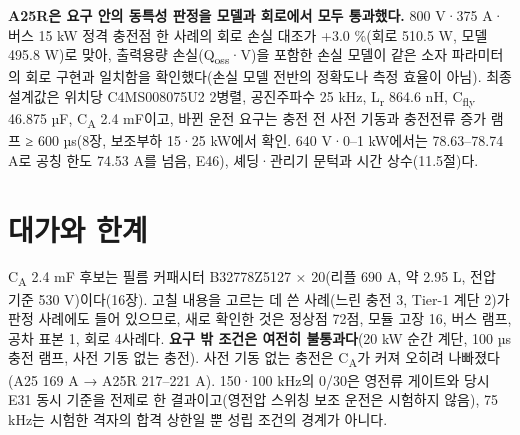 \textbf{A25R은 요구 안의 동특성 판정을 모델과 회로에서 모두 통과했다.} 800 V·375 A·버스 15 kW 정격 충전점 한 사례의 회로 손실 대조가 +3.0 \%(회로 510.5 W, 모델 495.8 W)로 맞아, 출력용량 손실(Q\textsubscript{oss}·V)을 포함한 손실 모델이 같은 소자 파라미터의 회로 구현과 일치함을 확인했다(손실 모델 전반의 정확도나 측정 효율이 아님). 최종 설계값은 위치당 C4MS008075U2 2병렬, 공진주파수 25 kHz, L\textsubscript{r} 864.6 nH, C\textsubscript{fly} 46.875 µF, C\textsubscript{A} 2.4 mF이고, 바뀐 운전 요구는 충전 전 사전 기동과 충전전류 증가 램프 ≥ 600 µs(8장, 보조부하 15·25 kW에서 확인. 640 V·0–1 kW에서는 78.63–78.74 A로 공칭 한도 74.53 A를 넘음, E46), 셰딩·관리기 문턱과 시간 상수(11.5절)다.

\section{대가와 한계}

C\textsubscript{A} 2.4 mF 후보는 필름 커패시터 B32778Z5127 × 20(리플 690 A, 약 2.95 L, 전압 기준 530 V)이다(16장). 고칠 내용을 고르는 데 쓴 사례(느린 충전 3, Tier-1 계단 2)가 판정 사례에도 들어 있으므로, 새로 확인한 것은 정상점 72점, 모듈 고장 16, 버스 램프, 공차 표본 1, 회로 4사례다. \textbf{요구 밖 조건은 여전히 불통과다}(20 kW 순간 계단, 100 µs 충전 램프, 사전 기동 없는 충전). 사전 기동 없는 충전은 C\textsubscript{A}가 커져 오히려 나빠졌다(A25 169 A → A25R 217–221 A). 150·100 kHz의 0/30은 영전류 게이트와 당시 E31 동시 기준을 전제로 한 결과이고(영전압 스위칭 보조 운전은 시험하지 않음), 75 kHz는 시험한 격자의 합격 상한일 뿐 성립 조건의 경계가 아니다.
